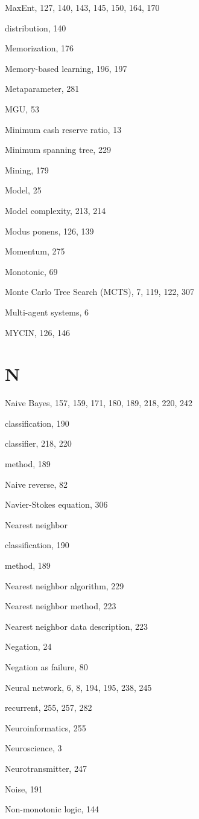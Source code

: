 \documentclass[10pt]{book}
\begin{document}
MaxEnt, 127, 140, 143, 145, 150, 164, 170

distribution, 140

Memorization, 176

Memory-based learning, 196, 197

Metaparameter, 281

MGU, 53

Minimum cash reserve ratio, 13

Minimum spanning tree, 229

Mining, 179

Model, 25

Model complexity, 213, 214

Modus ponens, 126, 139

Momentum, 275

Monotonic, 69

Monte Carlo Tree Search (MCTS), 7, 119, 122, 307

Multi-agent systems, 6

MYCIN, 126, 146

\section{N}

Naive Bayes, 157, 159, 171, 180, 189, 218, 220, 242

classification, 190

classifier, 218, 220

method, 189

Naive reverse, 82

Navier-Stokes equation, 306

Nearest neighbor

classification, 190

method, 189

Nearest neighbor algorithm, 229

Nearest neighbor method, 223

Nearest neighbor data description, 223

Negation, 24

Negation as failure, 80

Neural network, 6, 8, 194, 195, 238, 245

recurrent, 255, 257, 282

Neuroinformatics, 255

Neuroscience, 3

Neurotransmitter, 247

Noise, 191

Non-monotonic logic, 144
\end{document}
